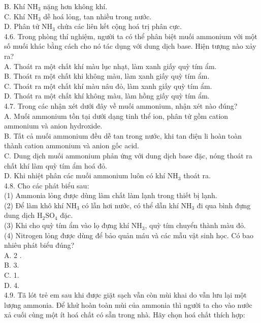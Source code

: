 \documentclass[10pt]{article}
\begin{document}
B. Khí $\mathrm{NH}_{3}$ nặng hơn không khí.\\
C. Khí $\mathrm{NH}_{3}$ dễ hoá lỏng, tan nhiều trong nước.\\
D. Phân tử $\mathrm{NH}_{3}$ chứa các liên kết cộng hoá trị phân cực.\\
4.6. Trong phòng thí nghiệm, người ta có thể phân biệt muối ammonium với một số muối khác bằng cách cho nó tác dụng với dung dịch base. Hiện tượng nào xảy ra?\\
A. Thoát ra một chất khí màu lục nhạt, làm xanh giấy quỳ tím ẩm.\\
B. Thoát ra một chất khi không màu, làm xanh giấy quỳ tím ẩm.\\
C. Thoát ra một chất khí màu nâu đỏ, làm xanh giấy quỳ tím ẩm.\\
D. Thoát ra một chất khí không màu, làm hồng giấy quỳ tím ẩm.\\
4.7. Trong các nhận xét dưới đây về muối ammonium, nhận xét nào đúng?\\
A. Muối ammonium tồn tại dưới dạng tinh thể ion, phân tử gồm cation ammonium và anion hydroxide.\\
B. Tất cả muối ammonium đều dễ tan trong nước, khi tan điện li hoàn toàn thành cation ammonium và anion gốc acid.\\
C. Dung dịch muối ammonium phản ứng với dung dịch base đặc, nóng thoát ra chất khí làm quỳ tím ẩm hoá đỏ.\\
D. Khi nhiệt phân các muối ammonium luôn có khí $\mathrm{NH}_{3}$ thoát ra.\\
4.8. Cho các phát biểu sau:\\
(1) Ammonia lỏng được dùng làm chất làm lạnh trong thiết bị lạnh.\\
(2) Để làm khô khí $\mathrm{NH}_{3}$ có lẫn hơi nước, có thể dẫn khí $\mathrm{NH}_{3}$ đi qua bình đựng dung dịch $\mathrm{H}_{2} \mathrm{SO}_{4}$ đặc.\\
(3) Khi cho quỳ tím ẩm vào lọ đựng khí $\mathrm{NH}_{3}$, quỳ tím chuyển thành màu đỏ.\\
(4) Nitrogen lỏng được dùng để bảo quản máu và các mẫu vật sinh học. Có bao nhiêu phát biểu đúng?\\
A. 2 .\\
B. 3.\\
C. 1.\\
D. 4.\\
4.9. Tã lót trẻ em sau khi được giặt sạch vẫn còn mùi khai do vẫn lưu lại một lượng ammonia. Để khử hoàn toàn mùi của ammonia thì người ta cho vào nước xả cuối cùng một ít hoá chất có sẵn trong nhà. Hãy chọn hoá chất thích hợp:\\
\end{document}

